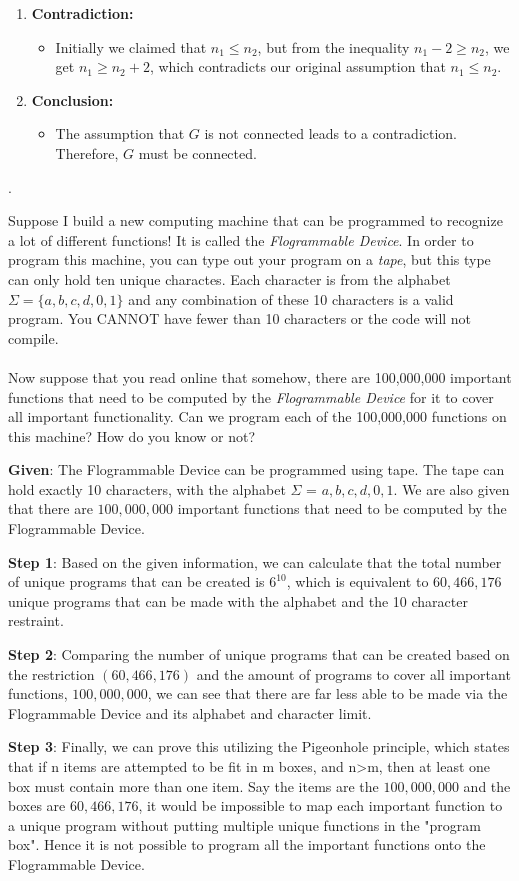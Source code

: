 \documentclass[12pt]{article}
\newcounter{quesnum}
\newcommand{\question}[2][??]{
\begin{list}{\labelitemi}{\leftmargin=2em}
\item [\arabic{quesnum}.] {} {#2}
\end{list}
\addtocounter{quesnum}{1}
}
\begin{document}
\begin{enumerate}
    \item \textbf{Contradiction:}
    \begin{itemize}
        \item Initially we claimed that $n_1 \leq n_2$, but from the inequality $n_1 - 2 \geq n_2$, we get $n_1 \geq n_2 + 2$, which contradicts our original assumption that $n_1 \leq n_2$.
    \end{itemize}
    
    \item \textbf{Conclusion:}
    \begin{itemize}
        \item The assumption that $G$ is not connected leads to a contradiction. Therefore, $G$ must be connected.
    \end{itemize}
\end{enumerate}


\question[3]{
Suppose I build a new computing machine that can be programmed to recognize a lot of different functions! It is called the \emph{Flogrammable Device}. In order to program this machine, you can type out your program on a \emph{tape}, but this type can only hold ten unique charactes. Each character is from the alphabet $\Sigma=\{a,b,c,d,0,1\}$ and any combination of these 10 characters is a valid program. You CANNOT have fewer than 10 characters or the code will not compile.\\
\\
Now suppose that you read online that somehow, there are 100,000,000 important functions that need to be computed by the \emph{Flogrammable Device} for it to cover all important functionality. Can we program each of the 100,000,000 functions on this machine? How do you know or not?


\textbf{Given}: The Flogrammable Device can be programmed using tape. The tape can hold exactly 10 characters, with the alphabet $\Sigma$ = ${a,b,c,d,0,1}$. We are also given that there are $100,000,000$ important functions that need to be computed by the Flogrammable Device.

\textbf{Step 1}: Based on the given information, we can calculate that the total number of unique programs that can be created is $6^{10}$, which is equivalent to $60,466,176$ unique programs that can be made with the alphabet and the 10 character restraint.

\textbf{Step 2}: Comparing the number of unique programs that can be created based on the restriction $(60,466,176)$ and the amount of programs to cover all important functions, $100,000,000$, we can see that there are far less able to be made via the Flogrammable Device and its alphabet and character limit.

\textbf{Step 3}: Finally, we can prove this utilizing the Pigeonhole principle, which states that if n items are attempted to be fit in m boxes, and n>m, then at least one box must contain more than one item. Say the items are the $100,000,000$ and the boxes are $60,466,176$, it would be impossible to map each important function to a unique program without putting multiple unique functions in the "program box". Hence it is not possible to program all the important functions onto the Flogrammable Device.

}
\end{document}
